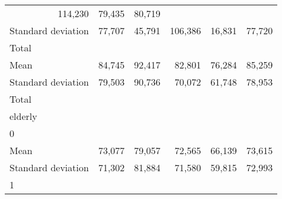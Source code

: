 \begin{tabular}{llllll}
  \multicolumn{1}{r}{114,230} &
  \multicolumn{1}{r}{79,435} &
  \multicolumn{1}{r}{80,719} \\
\multicolumn{1}{l}{\hspace{4em}Standard deviation} &
  \multicolumn{1}{|r}{77,707} &
  \multicolumn{1}{r}{45,791} &
  \multicolumn{1}{r}{106,386} &
  \multicolumn{1}{r}{16,831} &
  \multicolumn{1}{r}{77,720} \\
\multicolumn{1}{l}{\hspace{3em}Total} &
  \multicolumn{1}{|r}{} &
  \multicolumn{1}{r}{} &
  \multicolumn{1}{r}{} &
  \multicolumn{1}{r}{} &
  \multicolumn{1}{r}{} \\
\multicolumn{1}{l}{\hspace{4em}Mean} &
  \multicolumn{1}{|r}{84,745} &
  \multicolumn{1}{r}{92,417} &
  \multicolumn{1}{r}{82,801} &
  \multicolumn{1}{r}{76,284} &
  \multicolumn{1}{r}{85,259} \\
\multicolumn{1}{l}{\hspace{4em}Standard deviation} &
  \multicolumn{1}{|r}{79,503} &
  \multicolumn{1}{r}{90,736} &
  \multicolumn{1}{r}{70,072} &
  \multicolumn{1}{r}{61,748} &
  \multicolumn{1}{r}{78,953} \\
\multicolumn{1}{l}{\hspace{1em}Total} &
  \multicolumn{1}{|r}{} &
  \multicolumn{1}{r}{} &
  \multicolumn{1}{r}{} &
  \multicolumn{1}{r}{} &
  \multicolumn{1}{r}{} \\
\multicolumn{1}{l}{\hspace{2em}elderly} &
  \multicolumn{1}{|r}{} &
  \multicolumn{1}{r}{} &
  \multicolumn{1}{r}{} &
  \multicolumn{1}{r}{} &
  \multicolumn{1}{r}{} \\
\multicolumn{1}{l}{\hspace{3em}0} &
  \multicolumn{1}{|r}{} &
  \multicolumn{1}{r}{} &
  \multicolumn{1}{r}{} &
  \multicolumn{1}{r}{} &
  \multicolumn{1}{r}{} \\
\multicolumn{1}{l}{\hspace{4em}Mean} &
  \multicolumn{1}{|r}{73,077} &
  \multicolumn{1}{r}{79,057} &
  \multicolumn{1}{r}{72,565} &
  \multicolumn{1}{r}{66,139} &
  \multicolumn{1}{r}{73,615} \\
\multicolumn{1}{l}{\hspace{4em}Standard deviation} &
  \multicolumn{1}{|r}{71,302} &
  \multicolumn{1}{r}{81,884} &
  \multicolumn{1}{r}{71,580} &
  \multicolumn{1}{r}{59,815} &
  \multicolumn{1}{r}{72,993} \\
\multicolumn{1}{l}{\hspace{3em}1} &

\end{tabular}
